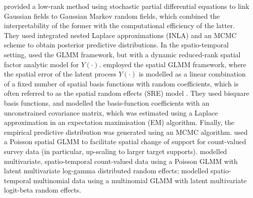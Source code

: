 \documentclass[nojss]{jss}
\begin{document}
 
\cite{Lindgren_Rue_2011_GF_GMRF_SPDE} provided a low-rank method using stochastic partial differential equations to link Gaussian fields to Gaussian Markov random fields, which combined the interpretability of the former with the computational efficiency of the latter. They used integrated nested Laplace approximations (INLA) and an MCMC scheme to obtain posterior predictive distributions. 
In the spatio-temporal setting, \cite{Lopes_2011_spatial_GLMM_reduced_rank_factor_analytic_model} used the GLMM framework, but with a dynamic reduced-rank spatial factor analytic model for $Y(\cdot)$. 
\cite{Sengupta_Cressie_2013_spatial_GLMM_FRK} employed the spatial GLMM framework, where the spatial error of the latent process $Y(\cdot)$ is modelled as a linear combination of a fixed number of spatial basis functions with random coefficients, which is often referred to as the spatial random effects (SRE) model \citep{Cressie_Johannesson_2008_FRK}. They used bisquare basis functions, and modelled the basis-function coefficients with an unconstrained covariance matrix, which was estimated using a Laplace approximation in an expectation maximisation (EM) algorithm. Finally, the empirical predictive distribution was generated using an MCMC algorithm. 
 \citet{Bradley_2016_Bayesian_spatial_COS_lattice_data} used a Poisson spatial GLMM to facilitate spatial change of support for count-valued survey data (in particular, up-scaling to larger target supports). 
\citet{Bradley_2018_computationally_efficient_multivariate_ST_models_for_high-dimensional_count-valued_data} modelled multivariate, spatio-temporal count-valued data using a Poisson GLMM with latent multivariate log-gamma distributed random effects;  \cite{Bradley_2019_ST_models_for_big_multinomial_data_using_conditional_multivariate_logit_beta_distribution} modelled spatio-temporal multinomial data using a multinomial GLMM with latent multivariate logit-beta random effects. 
\end{document}
